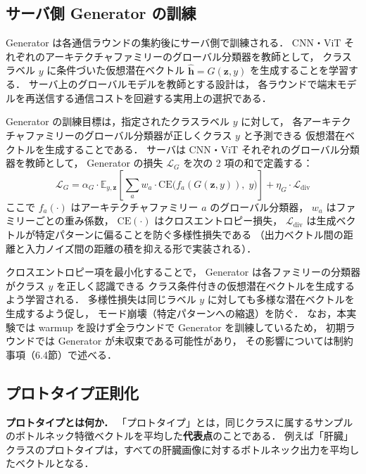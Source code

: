 \subsection{サーバ側 Generator の訓練}

Generator は各通信ラウンドの集約後にサーバ側で訓練される．
CNN・ViT それぞれのアーキテクチャファミリーのグローバル分類器を教師として，
クラスラベル $y$ に条件づいた仮想潜在ベクトル $\hat{\mathbf{h}} = G(\mathbf{z}, y)$ を生成することを学習する．
サーバ上のグローバルモデルを教師とする設計は，
各ラウンドで端末モデルを再送信する通信コストを回避する実用上の選択である．

Generator の訓練目標は，指定されたクラスラベル $y$ に対して，
各アーキテクチャファミリーのグローバル分類器が正しくクラス $y$ と予測できる
仮想潜在ベクトルを生成することである．
サーバは CNN・ViT それぞれのグローバル分類器を教師として，
Generator の損失 $\mathcal{L}_G$ を次の 2 項の和で定義する：
\begin{equation}
  \mathcal{L}_G = \alpha_G \cdot \mathbb{E}_{y, \mathbf{z}}\!\left[
    \sum_{a} w_a \cdot
    \mathrm{CE}\!\bigl(f_a(G(\mathbf{z}, y)),\; y\bigr)
  \right] + \eta_G \cdot \mathcal{L}_{\mathrm{div}}
  \label{eq:gen_loss}
\end{equation}
ここで $f_a(\cdot)$ はアーキテクチャファミリー $a$ のグローバル分類器，
$w_a$ はファミリーごとの重み係数，
$\mathrm{CE}(\cdot)$ はクロスエントロピー損失，
$\mathcal{L}_{\mathrm{div}}$ は生成ベクトルが特定パターンに偏ることを防ぐ多様性損失である
（出力ベクトル間の距離と入力ノイズ間の距離の積を抑える形で実装される）．

クロスエントロピー項を最小化することで，
Generator は各ファミリーの分類器がクラス $y$ を正しく認識できる
クラス条件付きの仮想潜在ベクトルを生成するよう学習される．
多様性損失は同じラベル $y$ に対しても多様な潜在ベクトルを生成するよう促し，
モード崩壊（特定パターンへの縮退）を防ぐ．
なお，本実験では warmup を設けず全ラウンドで Generator を訓練しているため，
初期ラウンドでは Generator が未収束である可能性があり，
その影響については制約事項（6.4節）で述べる．

\subsection{プロトタイプ正則化}

\textbf{プロトタイプとは何か．}
「プロトタイプ」とは，同じクラスに属するサンプルのボトルネック特徴ベクトルを平均した\textbf{代表点}のことである．
例えば「肝臓」クラスのプロトタイプは，すべての肝臓画像に対するボトルネック出力を平均したベクトルとなる．

